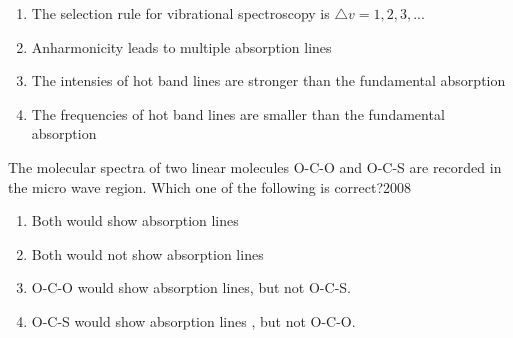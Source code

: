             \begin{enumerate}
              \item The selection rule for vibrational spectroscopy is $\triangle v=1,2,3,...$
              \item Anharmonicity leads to multiple absorption lines
              \item The intensies of hot band lines are stronger than the fundamental absorption 
              \item The frequencies of hot band lines are smaller than the fundamental absorption 
            \end{enumerate}
        
        \item  The molecular spectra of two linear molecules O-C-O and O-C-S are recorded in the micro wave region. Which one of the following is correct?\hfill{2008}
        
        \begin{enumerate}
        \item Both would show absorption lines 
        \item Both would not show absorption lines
          \item  O-C-O would show absorption lines, but not O-C-S.
          \item  O-C-S would show absorption lines , but not O-C-O.
          \end{enumerate}
        

        
 


